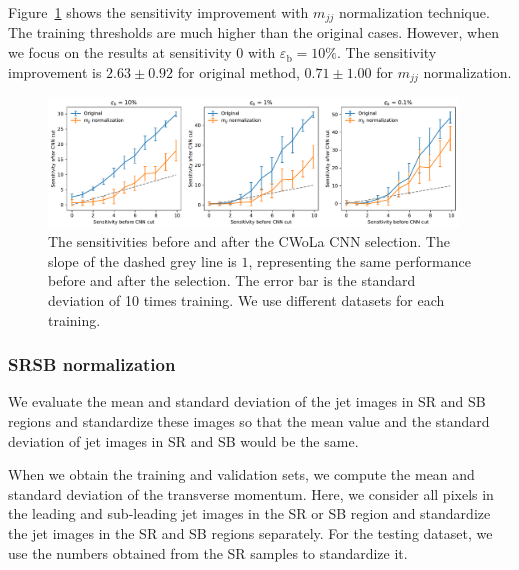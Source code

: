 \documentclass[12pt]{article}
\begin{document}
             Figure~\ref{fig:sensitivity_improvement_background_subtraction_origin_mjj_normalized} shows the sensitivity improvement with $m_{jj}$ normalization technique. The training thresholds are much higher than the original cases. However, when we focus on the results at sensitivity 0 with $\varepsilon_{\text{b}} = 10\%$. The sensitivity improvement is $2.63 \pm 0.92$ for original method, $0.71 \pm 1.00$ for $m_{jj}$ normalization. 
            \begin{figure}[htpb]
                \centering
                \includegraphics[width=0.97\textwidth]{HVmodel_sensitivity_improvement_origin_mjj_normalied.pdf}
                \caption{The sensitivities before and after the CWoLa CNN selection. The slope of the dashed grey line is $1$, representing the same performance before and after the selection. The error bar is the standard deviation of 10 times training. We use different datasets for each training.}
                \label{fig:sensitivity_improvement_background_subtraction_origin_mjj_normalized}
            \end{figure}
        \subsubsection{SRSB normalization}%
        \label{subs:srsb_normalization}
            We evaluate the mean and standard deviation of the jet images in SR and SB regions and standardize these images so that the mean value and the standard deviation of jet images in SR and SB would be the same.

            When we obtain the training and validation sets, we compute the mean and standard deviation of the transverse momentum. Here, we consider all pixels in the leading and sub-leading jet images in the SR or SB region and standardize the jet images in the SR and SB regions separately. For the testing dataset, we use the numbers obtained from the SR samples to standardize it.
\end{document}
